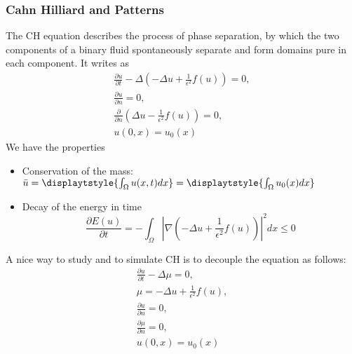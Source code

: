 \documentclass[11pt]{article}
\newcommand{\Frac}[2] {\frac{\textstyle #1} {\textstyle #2}}
\begin{document}
\subsubsection{Cahn Hilliard and Patterns}
The CH equation describes the process of phase separation, by which the two components of a binary fluid spontaneously separate and form domains pure in each component. It writes as
\begin{eqnarray}
\Frac{\partial u}{\partial t} -\Delta( -\Delta u +\Frac{1}{\epsilon^2}f(u))=0,\\
\Frac{\partial u}{\partial n}=0,\\
\Frac{\partial }{\partial n}\left(\Delta u-\Frac{1}{\epsilon^2}f(u)\right)=0,\\
u(0,x)=u_0(x)
\end{eqnarray}
We have the properties
\begin{itemize}
\item Conservation of the mass: ${\bar u}=\displaytstyle{\int_{\Omega}u(x,t)dx}=\displaytstyle{\int_{\Omega}u_0(x)dx}$
\item Decay of the energy in time
$$
\Frac{\partial E(u)}{\partial t}=
-\displaystyle{\int_{\Omega}|\nabla( -\Delta u +\Frac{1}{\epsilon^2}f(u))|^2dx}\le 0
$$
\end{itemize}
A nice way to study and to simulate CH is to decouple the equation as follows:
\begin{eqnarray}
\Frac{\partial u}{\partial t} -\Delta\mu=0,\\
\mu= -\Delta u +\Frac{1}{\epsilon^2}f(u),\\
\Frac{\partial u}{\partial n}=0,\\
\Frac{\partial \mu}{\partial n}=0,\\
u(0,x)=u_0(x)
\end{eqnarray}
\end{document}
